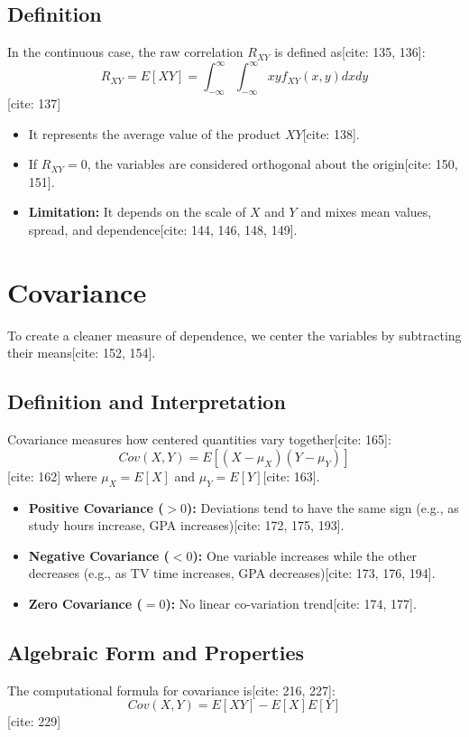 \documentclass[11pt]{article}
\begin{document}
\subsection{Definition}
In the continuous case, the raw correlation $R_{XY}$ is defined as[cite: 135, 136]:
$$R_{XY} = E[XY] = \int_{-\infty}^{\infty} \int_{-\infty}^{\infty} xy f_{XY}(x,y) dx dy$$ [cite: 137]
\begin{itemize}
    \item It represents the average value of the product $XY$[cite: 138].
    \item If $R_{XY} = 0$, the variables are considered orthogonal about the origin[cite: 150, 151].
    \item \textbf{Limitation:} It depends on the scale of $X$ and $Y$ and mixes mean values, spread, and dependence[cite: 144, 146, 148, 149].
\end{itemize}

\section{Covariance}
To create a cleaner measure of dependence, we center the variables by subtracting their means[cite: 152, 154].

\subsection{Definition and Interpretation}
Covariance measures how centered quantities vary together[cite: 165]:
$$Cov(X,Y) = E[(X-\mu_{X})(Y-\mu_{Y})]$$ [cite: 162]
where $\mu_{X} = E[X]$ and $\mu_{Y} = E[Y]$[cite: 163].
\begin{itemize}
    \item \textbf{Positive Covariance ($>0$):} Deviations tend to have the same sign (e.g., as study hours increase, GPA increases)[cite: 172, 175, 193].
    \item \textbf{Negative Covariance ($<0$):} One variable increases while the other decreases (e.g., as TV time increases, GPA decreases)[cite: 173, 176, 194].
    \item \textbf{Zero Covariance ($=0$):} No linear co-variation trend[cite: 174, 177].
\end{itemize}

\subsection{Algebraic Form and Properties}
The computational formula for covariance is[cite: 216, 227]:
$$Cov(X,Y) = E[XY] - E[X]E[Y]$$ [cite: 229]
\end{document}
